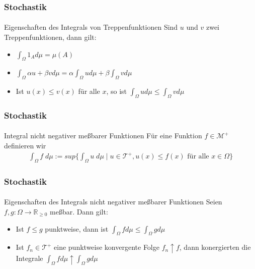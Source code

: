 \documentclass{beamer}
\begin{document}
\begin{frame}
    \frametitle{Stochastik}
\framesubtitle{}
\begin{block}{Eigenschaften des Integrals von Treppenfunktionen}
    Sind $u$ und $v$ zwei Treppenfunktionen, dann gilt:
    \begin{itemize}
    \item $\int_{\Omega} 1_A  d\mu  = \mu (A)$  
    \item $\int_{\Omega} \alpha u  + \beta v d\mu = \alpha \int_{\Omega}  u d\mu + \beta  \int_{\Omega}  v d\mu$
    \item Ist $u(x) \leq v(x)$ für alle $x$, so ist $\int_{\Omega} u d\mu \leq \int_{\Omega} v d\mu$ 
    \end{itemize}
    \end{block}
\end{frame}



\begin{frame}
    \frametitle{Stochastik}
\framesubtitle{}
    \begin{block}{Integral nicht negativer meßbarer Funktionen}
        Für eine Funktion $f \in \mathcal{M}^+$ definieren wir
        \begin{align*}
            \int_{\Omega} f \;  d \mu := sup \biggl \{ \int_{\Omega} u \; d\mu \; | \; u \in \mathcal{T}^+, u(x) \leq f(x) \text{ für alle } x \in \Omega  \biggr  \}   
        \end{align*}
\end{block}
\end{frame}

\begin{frame}
    \frametitle{Stochastik}
\framesubtitle{}
    \begin{block}{Eigenschaften des Integrals nicht negativer meßbarer Funktionen}
        Seien $f,g :\Omega \to \mathbb{R}_{\geq 0}$ meßbar.
        Dann gilt:
        \begin{itemize}
        \item Ist $f \leq g$ punktweise, dann ist $\int_{\Omega} f  d\mu  \leq \int_{\Omega} g  d\mu$
            \item      Ist   $f_n \in \mathcal{T}^+$ eine punktweise konvergente Folge $f_n \uparrow f$, dann konergierten die Integrale 
            $\int_{\Omega} f  d\mu \uparrow  \int_{\Omega} g  d\mu$
    \end{itemize}
        \end{block}
\end{frame}
\end{document}
